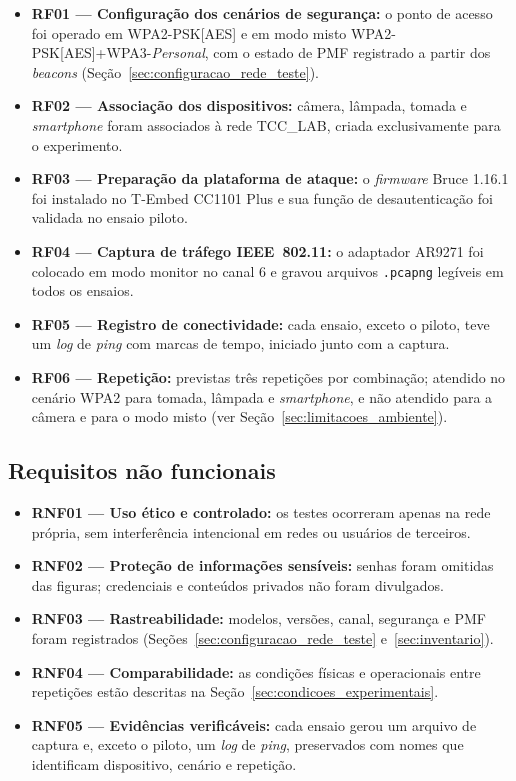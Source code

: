 \begin{itemize}
    \item \textbf{RF01 --- Configuração dos cenários de segurança:} o ponto de acesso foi operado em WPA2-PSK[AES] e em modo misto WPA2-PSK[AES]+WPA3-\textit{Personal}, com o estado de PMF registrado a partir dos \textit{beacons} (Seção~\ref{sec:configuracao_rede_teste}).
    \item \textbf{RF02 --- Associação dos dispositivos:} câmera, lâmpada, tomada e \textit{smartphone} foram associados à rede TCC\_LAB, criada exclusivamente para o experimento.
    \item \textbf{RF03 --- Preparação da plataforma de ataque:} o \textit{firmware} Bruce 1.16.1 foi instalado no T-Embed CC1101 Plus e sua função de desautenticação foi validada no ensaio piloto.
    \item \textbf{RF04 --- Captura de tráfego IEEE~802.11:} o adaptador AR9271 foi colocado em modo monitor no canal 6 e gravou arquivos \texttt{.pcapng} legíveis em todos os ensaios.
    \item \textbf{RF05 --- Registro de conectividade:} cada ensaio, exceto o piloto, teve um \textit{log} de \textit{ping} com marcas de tempo, iniciado junto com a captura.
    \item \textbf{RF06 --- Repetição:} previstas três repetições por combinação; atendido no cenário WPA2 para tomada, lâmpada e \textit{smartphone}, e não atendido para a câmera e para o modo misto (ver Seção~\ref{sec:limitacoes_ambiente}).
\end{itemize}

\subsection{Requisitos não funcionais}
\label{subsec:requisitos_nao_funcionais}

\begin{itemize}
    \item \textbf{RNF01 --- Uso ético e controlado:} os testes ocorreram apenas na rede própria, sem interferência intencional em redes ou usuários de terceiros.
    \item \textbf{RNF02 --- Proteção de informações sensíveis:} senhas foram omitidas das figuras; credenciais e conteúdos privados não foram divulgados.
    \item \textbf{RNF03 --- Rastreabilidade:} modelos, versões, canal, segurança e PMF foram registrados (Seções~\ref{sec:configuracao_rede_teste} e~\ref{sec:inventario}).
    \item \textbf{RNF04 --- Comparabilidade:} as condições físicas e operacionais entre repetições estão descritas na Seção~\ref{sec:condicoes_experimentais}.
    \item \textbf{RNF05 --- Evidências verificáveis:} cada ensaio gerou um arquivo de captura e, exceto o piloto, um \textit{log} de \textit{ping}, preservados com nomes que identificam dispositivo, cenário e repetição.
\end{itemize}

